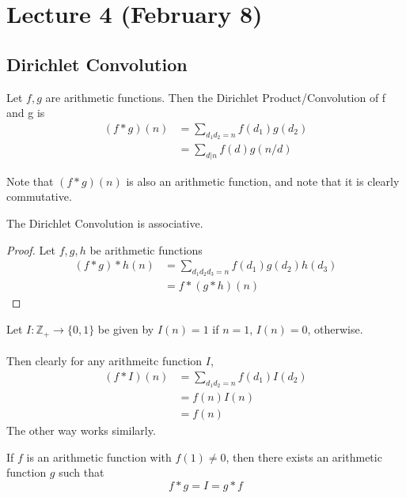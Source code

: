 \section{Lecture 4 (February 8)}
\subsection{Dirichlet Convolution}
\begin{definition}
Let $f, g$ are arithmetic functions. Then the Dirichlet Product/Convolution of f and g is
\begin{align*}
    (f * g)(n) &= \sum_{d_1d_2 = n} f(d_1)g(d_2)\\
    &= \sum_{d | n} f(d)g(n/d)
\end{align*}
\end{definition}

\begin{remark}
Note that $(f * g)(n)$ is also an arithmetic function, and note that it is clearly commutative.
\end{remark}

\begin{proposition}
The Dirichlet Convolution is associative.
\end{proposition}

\begin{proof}
Let $f, g, h$ be arithmetic functions
\begin{align*}
    (f * g) * h(n) &= \sum_{d_1d_2d_3 = n} f(d_1)g(d_2)h(d_3)\\
    &= f * (g * h)(n)
\end{align*}
\end{proof}

\begin{definition}
Let $I: \mathbb{Z}_+ \to \{0, 1\}$ be given by $I(n) = 1$ if $n = 1$, $I(n) = 0$, otherwise.\\\\
Then clearly for any arithmeitc function $I$,
\begin{align*}
    (f * I)(n) &= \sum_{d_1d_2 = n} f(d_1)I(d_2)\\
    &= f(n)I(n)\\
    &= f(n)
\end{align*}
The other way works similarly.
\end{definition}

\begin{lemma}
If $f$ is an arithmetic function with $f(1) \neq 0$, then there exists an arithmetic function $g$ such that
\[f * g = I = g * f\]
\end{lemma}

